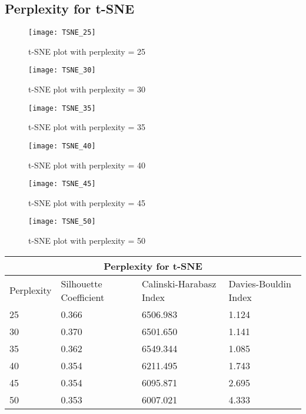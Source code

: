 \documentclass[11pt]{article}
\theoremstyle{definition}
\begin{document}
\subsection{Perplexity for t-SNE}
\begin{figure}[H]
  \centering
  \captionsetup{justification=centering}
  \begin{minipage}[b]{0.2\textwidth}
    \centerline{\texttt{[image: TSNE\_25]}}
    \caption{t-SNE plot with perplexity = 25}
  \end{minipage}
  \hfill
  \begin{minipage}[b]{0.2\textwidth}
    \centerline{\texttt{[image: TSNE\_30]}}
    \caption{t-SNE plot with perplexity = 30}
  \end{minipage}
    \hfill
  \begin{minipage}[b]{0.2\textwidth}
    \centerline{\texttt{[image: TSNE\_35]}}
    \caption{t-SNE plot with perplexity = 35}
  \end{minipage}
    \hfill
  \begin{minipage}[b]{0.2\textwidth}
    \centerline{\texttt{[image: TSNE\_40]}}
    \caption{t-SNE plot with perplexity = 40}
  \end{minipage}
\end{figure}
\begin{figure} [H]
    \centering
    \captionsetup{justification=centering}
  \begin{minipage}[]{0.2\textwidth}
    \centerline{\texttt{[image: TSNE\_45]}}
    \caption{t-SNE plot with perplexity = 45}
  \end{minipage}
    \hspace{1cm}
  \begin{minipage}[]{0.2\textwidth}
    \centerline{\texttt{[image: TSNE\_50]}}
    \caption{t-SNE plot with perplexity = 50}
  \end{minipage}
\end{figure}

\begin{center}
\begin{tabular}{ |p{2cm}||p{4cm}||p{4.2cm}||p{4.2cm}|}
 \hline
 \multicolumn{4}{|c|}{Perplexity for t-SNE} \\
 \hline
 Perplexity & Silhouette Coefficient & Calinski-Harabasz Index & Davies-Bouldin Index \\
 \hline
25 & 0.366 & 6506.983 & 1.124\\
30 & 0.370 & 6501.650 & 1.141\\
35 & 0.362 & 6549.344 & 1.085\\
40 & 0.354 & 6211.495 & 1.743\\
45 & 0.354 & 6095.871 & 2.695\\
50 & 0.353 & 6007.021 & 4.333\\
 \hline
\end{tabular}
\end{center}
\end{document}

